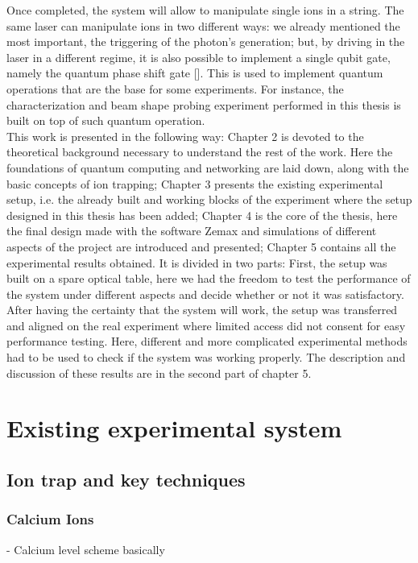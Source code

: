 \documentclass[english, a4paper, 12pt, twoside]{book}
\numberwithin{equation}{section} %
\begin{document}
 Once completed, the system will allow to manipulate single ions in a string. The same laser can manipulate ions in two different ways: we already mentioned the most important, the triggering of the photon's generation; but, by driving in the laser in a different regime, it is also possible to implement a single qubit gate, namely the quantum phase shift gate []. This is used to implement quantum operations that are the base for some experiments. For instance, the characterization and beam shape probing experiment performed in this thesis is built on top of such quantum operation.\\
 \newline
 This work is presented in the following way: Chapter 2 is devoted to the theoretical background necessary to understand the rest of the work. Here the foundations of quantum computing and networking are laid down, along with the basic concepts of ion trapping; Chapter 3 presents the existing experimental setup, i.e. the already built and working blocks of the experiment where the setup designed in this thesis has been added; Chapter 4 is the core of the thesis, here the final design made with the software Zemax and simulations of different aspects of the project are introduced and presented;
Chapter 5 contains all the experimental results obtained. It is divided in two parts: First, the setup was built on a spare optical table, here we had the freedom to test the performance of the system under different aspects and decide whether or not it was satisfactory. After having the certainty that the system will work, the setup was transferred and aligned on the real experiment where limited access did not consent for easy performance testing. Here, different and more complicated experimental methods had to be used to check if the system was working properly. The description and discussion of these results are in the second part of chapter 5.



\chapter{Existing experimental system}
\section{Ion trap and key techniques}
\subsection{Calcium Ions}
- Calcium level scheme basically
\end{document}
